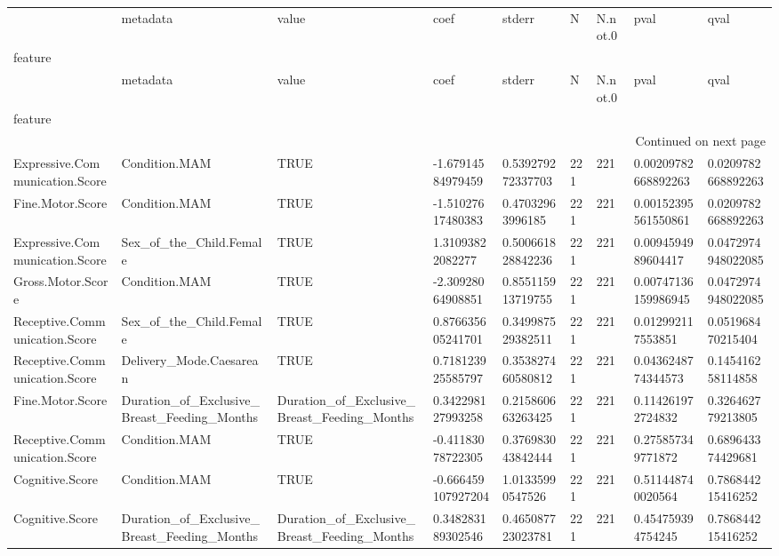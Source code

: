 \begin{longtable}{lllllllll}
\toprule
 & metadata & value & coef & stderr & N & N.not.0 & pval & qval \\
feature &  &  &  &  &  &  &  &  \\
\midrule
\endfirsthead
\toprule
 & metadata & value & coef & stderr & N & N.not.0 & pval & qval \\
feature &  &  &  &  &  &  &  &  \\
\midrule
\endhead
\midrule
\multicolumn{9}{r}{Continued on next page} \\
\midrule
\endfoot
\bottomrule
\endlastfoot
Expressive.Communication.Score & Condition.MAM & TRUE & -1.67914584979459 & 0.539279272337703 & 221 & 221 & 0.00209782668892263 & 0.0209782668892263 \\
Fine.Motor.Score & Condition.MAM & TRUE & -1.51027617480383 & 0.47032963996185 & 221 & 221 & 0.00152395561550861 & 0.0209782668892263 \\
Expressive.Communication.Score & Sex\_of\_the\_Child.Female & TRUE & 1.31093822082277 & 0.500661828842236 & 221 & 221 & 0.0094594989604417 & 0.0472974948022085 \\
Gross.Motor.Score & Condition.MAM & TRUE & -2.30928064908851 & 0.855115913719755 & 221 & 221 & 0.00747136159986945 & 0.0472974948022085 \\
Receptive.Communication.Score & Sex\_of\_the\_Child.Female & TRUE & 0.876635605241701 & 0.349987529382511 & 221 & 221 & 0.012992117553851 & 0.051968470215404 \\
Receptive.Communication.Score & Delivery\_Mode.Caesarean & TRUE & 0.718123925585797 & 0.353827460580812 & 221 & 221 & 0.0436248774344573 & 0.145416258114858 \\
Fine.Motor.Score & Duration\_of\_Exclusive\_Breast\_Feeding\_Months & Duration\_of\_Exclusive\_Breast\_Feeding\_Months & 0.342298127993258 & 0.215860663263425 & 221 & 221 & 0.114261972724832 & 0.326462779213805 \\
Receptive.Communication.Score & Condition.MAM & TRUE & -0.41183078722305 & 0.376983043842444 & 221 & 221 & 0.275857349771872 & 0.689643374429681 \\
Cognitive.Score & Condition.MAM & TRUE & -0.666459107927204 & 1.01335990547526 & 221 & 221 & 0.511448740020564 & 0.786844215416252 \\
Cognitive.Score & Duration\_of\_Exclusive\_Breast\_Feeding\_Months & Duration\_of\_Exclusive\_Breast\_Feeding\_Months & 0.348283189302546 & 0.465087723023781 & 221 & 221 & 0.454759394754245 & 0.786844215416252 \\

\end{longtable}
